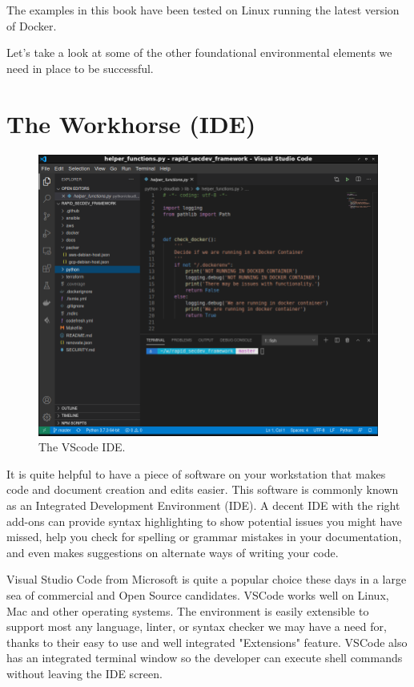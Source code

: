 \justify
The examples in this book have been tested on Linux running the latest
version of Docker.

\justify
Let's take a look at some of the other foundational environmental
elements we need in place to be successful.

\section{The Workhorse (IDE)}
\begin{figure}
	\centering
	\includegraphics[scale=0.45]{../images/setup-vscode.png}
	\caption{The VScode IDE.}
\end{figure}
\justify
It is quite helpful to have a piece of software on your workstation that
makes code and document creation and edits easier. This software is
commonly known as an Integrated Development Environment (IDE).
A decent IDE with the right add-ons can provide syntax highlighting to show
potential issues you might have missed, help you check for spelling or
grammar mistakes in your documentation, and even makes suggestions on
alternate ways of writing your code.

\justify
Visual Studio Code from Microsoft is quite a popular choice these
days in a large sea of commercial and Open Source candidates. 
VSCode works well on Linux, Mac and other operating systems.
The environment is easily extensible to support most any language,
linter, or syntax checker we may have a need
for, thanks to their easy to use and well integrated "Extensions"
feature. VSCode also has an integrated terminal window 
so the developer can execute shell commands without leaving the IDE screen.

